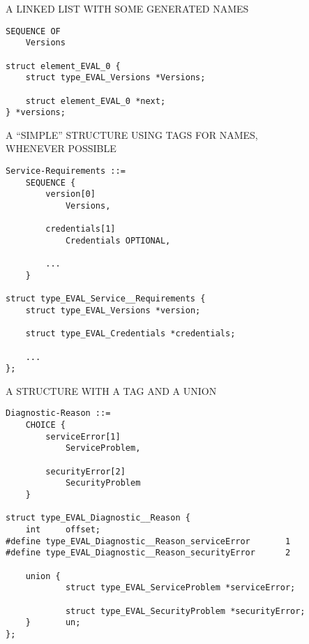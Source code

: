 \begin{bwslide}

\begin{nrtc}
\item	A LINKED LIST WITH SOME GENERATED NAMES
\begin{verbatim}
SEQUENCE OF
    Versions

struct element_EVAL_0 {
    struct type_EVAL_Versions *Versions;

    struct element_EVAL_0 *next;
} *versions;
\end{verbatim}
\end{nrtc}
\end{bwslide}


\begin{bwslide}

\begin{nrtc}
\item	A ``SIMPLE'' STRUCTURE USING TAGS FOR NAMES,\\ WHENEVER POSSIBLE
\begin{verbatim}
Service-Requirements ::=
    SEQUENCE {
        version[0]
            Versions,

        credentials[1]
            Credentials OPTIONAL,

        ...
    }

struct type_EVAL_Service__Requirements {
    struct type_EVAL_Versions *version;

    struct type_EVAL_Credentials *credentials;

    ...
};
\end{verbatim}
\end{nrtc}
\end{bwslide}


\begin{bwslide}

\begin{nrtc}
\item	A STRUCTURE WITH A TAG AND A UNION
\small\begin{verbatim}
Diagnostic-Reason ::=
    CHOICE {
        serviceError[1]
            ServiceProblem,

        securityError[2]
            SecurityProblem
    }

struct type_EVAL_Diagnostic__Reason {
    int     offset;
#define type_EVAL_Diagnostic__Reason_serviceError       1
#define type_EVAL_Diagnostic__Reason_securityError      2

    union {
            struct type_EVAL_ServiceProblem *serviceError;

            struct type_EVAL_SecurityProblem *securityError;
    }       un;
};
\end{verbatim}
\end{nrtc}
\end{bwslide}


